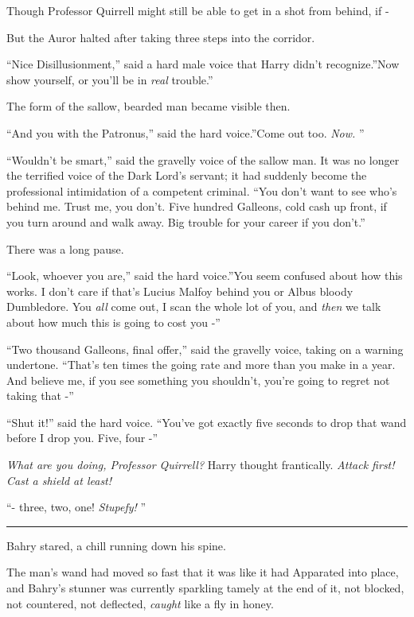 Though Professor Quirrell might still be able to get in a shot from
behind, if -

But the Auror halted after taking three steps into the corridor.

``Nice Disillusionment,'' said a hard male voice that Harry didn't
recognize.''Now show yourself, or you'll be in \emph{real} trouble.''

The form of the sallow, bearded man became visible then.

``And you with the Patronus,'' said the hard voice.''Come out too.
\emph{Now.} ''

``Wouldn't be smart,'' said the gravelly voice of the sallow man. It was
no longer the terrified voice of the Dark Lord's servant; it had
suddenly become the professional intimidation of a competent criminal.
``You don't want to see who's behind me. Trust me, you don't. Five
hundred Galleons, cold cash up front, if you turn around and walk away.
Big trouble for your career if you don't.''

There was a long pause.

``Look, whoever you are,'' said the hard voice.''You seem confused about
how this works. I don't care if that's Lucius Malfoy behind you or Albus
bloody Dumbledore. You \emph{all} come out, I scan the whole lot of you,
and \emph{then} we talk about how much this is going to cost you -''

``Two thousand Galleons, final offer,'' said the gravelly voice, taking
on a warning undertone. ``That's ten times the going rate and more than
you make in a year. And believe me, if you see something you shouldn't,
you're going to regret not taking that -''

``Shut it!'' said the hard voice. ``You've got exactly five seconds to
drop that wand before I drop you. Five, four -''

\emph{What are you doing, Professor Quirrell?} Harry thought
frantically. \emph{Attack first! Cast a shield at least!}

``- three, two, one! \emph{Stupefy!} ''

\begin{center}\rule{3in}{0.4pt}\end{center}

Bahry stared, a chill running down his spine.

The man's wand had moved so fast that it was like it had Apparated into
place, and Bahry's stunner was currently sparkling tamely at the end of
it, not blocked, not countered, not deflected, \emph{caught} like a fly
in honey.


